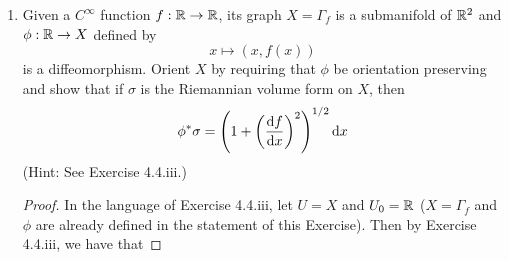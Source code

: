 \documentclass[../psets.tex]{subfiles}
\begin{document}
\begin{enumerate}[label={\textbf{4.4.\roman*.}}]
\begin{proof}
        where
        \begin{equation*}
            \phi_{i,j} = B(v_i,v_j)
            = B(\dd\phi_p(\pdv*{x_i})_p,\dd\phi_p(\pdv*{x_j})_p)
            = B\left(
                \begin{bmatrix}
                    \pdv{\phi_1}{x_i}\\
                    \vdots\\
                    \pdv{\phi_N}{x_i}\\
                \end{bmatrix},
                \begin{bmatrix}
                    \pdv{\phi_1}{x_j}\\
                    \vdots\\
                    \pdv{\phi_N}{x_j}\\
                \end{bmatrix}
            \right)
            = \sum_{k=1}^N\pdv{\phi_k}{x_i}\pdv{\phi_k}{x_j}
        \end{equation*}
        for $1\leq i,j\leq n$ and
        \begin{equation*}
            (\vol_{U_0})_p = x_1^*\wedge\cdots\wedge x_n^*
            = (\dd{x_1}\wedge\cdots\wedge\dd{x_n})_p
        \end{equation*}
        as desired.\par
        Since $\phi^*\sigma$ is clearly a smooth $n$-form on $\R^n$ by the above equality, $\sigma$ itself is smooth. It follows since $\phi^*\sigma$ is also non-vanishing and $\phi$ is orientation preserving that $\sigma$ itself is nonvanishing and strictly positive; hence $\sigma$ is, indeed, the volume form.
    \end{proof}
    \item Given a $C^\infty$ function $f:\mathbb{R}\to\mathbb{R}$, its graph $X=\Gamma_f$ is a submanifold of $\mathbb{R}^2$ and $\phi:\mathbb{R}\to X$ defined by
    \begin{equation*}
        x \mapsto (x,f(x))
    \end{equation*}
    is a diffeomorphism. Orient $X$ by requiring that $\phi$ be orientation preserving and show that if $\sigma$ is the Riemannian volume form on $X$, then
    \begin{equation*}
        \phi^*\sigma = \left( 1+\left( \dv{f}{x} \right)^2 \right)^{1/2}\dd{x}
    \end{equation*}
    (Hint: See Exercise 4.4.iii.)
    \begin{proof}
        In the language of Exercise 4.4.iii, let $U=X$ and $U_0=\mathbb{R}$ ($X=\Gamma_f$ and $\phi$ are already defined in the statement of this Exercise). Then by Exercise 4.4.iii, we have that

\end{proof}
\end{enumerate}
\end{document}
